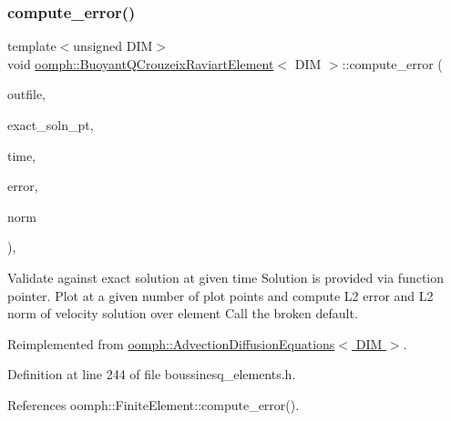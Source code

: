\subsubsection{\texorpdfstring{compute\+\_\+error()}{compute\_error()}\hspace{0.1cm}{\footnotesize\ttfamily [1/2]}}
{\footnotesize\ttfamily template$<$unsigned D\+IM$>$ \\
void \hyperlink{classoomph_1_1BuoyantQCrouzeixRaviartElement}{oomph\+::\+Buoyant\+Q\+Crouzeix\+Raviart\+Element}$<$ D\+IM $>$\+::compute\+\_\+error (\begin{DoxyParamCaption}\item[{std\+::ostream \&}]{outfile,  }\item[{\hyperlink{classoomph_1_1FiniteElement_ad4ecf2b61b158a4b4d351a60d23c633e}{Finite\+Element\+::\+Unsteady\+Exact\+Solution\+Fct\+Pt}}]{exact\+\_\+soln\+\_\+pt,  }\item[{const double \&}]{time,  }\item[{double \&}]{error,  }\item[{double \&}]{norm }\end{DoxyParamCaption})\hspace{0.3cm}{\ttfamily [inline]}, {\ttfamily [virtual]}}



Validate against exact solution at given time Solution is provided via function pointer. Plot at a given number of plot points and compute L2 error and L2 norm of velocity solution over element Call the broken default. 



Reimplemented from \hyperlink{classoomph_1_1AdvectionDiffusionEquations_a87c8c4e8ff5ea6e6dcb243ec83bb4fd2}{oomph\+::\+Advection\+Diffusion\+Equations$<$ D\+I\+M $>$}.



Definition at line 244 of file boussinesq\+\_\+elements.\+h.



References oomph\+::\+Finite\+Element\+::compute\+\_\+error().

\mbox{\label{classoomph_1_1BuoyantQCrouzeixRaviartElement_a2aa63b1b2ec1130835ee87cbf52cc086}} 
